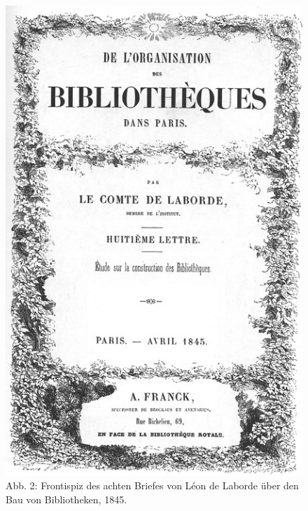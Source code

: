 \begin{figure}[htbp]
\centering
\includegraphics{img/wagner-2.jpg}
\caption{Abb. 2: Frontispiz des achten Briefes von Léon de Laborde über
den Bau von Bibliotheken, 1845.}
\end{figure}

